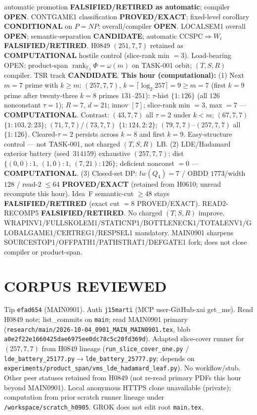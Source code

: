 \documentclass[11pt]{article}
\begin{document}
automatic promotion \textbf{FALSIFIED/RETIRED as automatic}; compiler \textbf{OPEN}.
CONTGAME1 classification \textbf{PROVED/EXACT}; fixed-level corollary \textbf{CONDITIONAL} on $P=NP$;
overall/compiler \textbf{OPEN}.
LOCALSEM1 overall \textbf{OPEN}; semantic-separation \textbf{CANDIDATE}; automatic CCSPC$\Rightarrow W_i$
\textbf{FALSIFIED/RETIRED}.
H0849 $(251,7,7)$ retained as \textbf{COMPUTATIONAL} hostile control (slice-rank min $=3$).
Load-bearing OPEN: product-span $\operatorname{rank}_{\mathbb F_2}\Phi=\omega(m)$ on TASK-001 orbit;
$(T,S,R)$ compiler. TSR track \textbf{CANDIDATE}.
\textbf{This hour (computational):}
(1) Next $m{=}7$ prime with $k{\ge}m$: $(257,7,7)$, $k=\lceil\log_2 257\rceil=9{\ge}m{=}7$
(first $k{=}9$ prime after twenty-three $k{=}8$ primes $131$--$251$):
$\tau$-hist $\{1{:}126\}$ (all $126$ nonconstant $\tau{=}1$); $R{=}7$, $d{=}21$; innov $[7]$;
slice-rank min $=3$, max $=7$ --- \textbf{COMPUTATIONAL}.
Contrast: $(43,7,7)$ all $\tau{=}2$ under $k{<}m$; $(67,7,7)$ $\{1{:}103,2{:}23\}$;
$(71,7,7)$/$(73,7,7)$ $\{1{:}124,2{:}2\}$; $(79,7,7)$--$(257,7,7)$ all $\{1{:}126\}$.
Cleared-$\tau{=}2$ persists across $k{=}8$ and first $k{=}9$. Easy-structure control --- not TASK-001,
not charged $(T,S,R)$ LB.
(2) LDE/Hadamard exterior battery (seed~$314159$) exhaustive $(257,7,7)$:
dist $\{(0,0){:}1,\,(1,0){:}1,\,(7,21){:}126\}$; deficient nonconst $=0$ --- \textbf{COMPUTATIONAL}.
(3) Closed-set DP: $lw(Q_4)=7$ / OBDD $1773$/width $128$ / read-$2$ $\le64$
\textbf{PROVED/EXACT} (retained from H0610; unread recompute this hour).
Idea~F semantic-cut $\ge48$ stays \textbf{FALSIFIED/RETIRED} (exact cut $=8$ PROVED/EXACT).
READ2-RECOMP5 \textbf{FALSIFIED/RETIRED}. No charged $(T,S,R)$ improve.
WRAPINV1/FULLSKOLEM1/STATICNP1/BOTTLENECK1/TOTALENV1/GLOBALGAME1/CERTREG1/RESPSEL1 mandatory.
MAIN0901 sharpens SOURCESTOP1/OFFPATH1/PATHSTRAT1/DEFGATE1 fork; does not close compiler or product-span.

\section*{CORPUS REVIEWED}
Tip \texttt{efad654} (MAIN0901). Auth \texttt{j15marti} (MCP user-GitHub-xai get\_me).
Read H0849 note; list\_commits on \texttt{main}; read MAIN0901 primary
(\texttt{research/main/2026-10-04\_0901\_MAIN\_MAIN0901.tex}, blob \texttt{a0e2f22e1660425dae6975ee0dc78c5c20fd369d}).
Adapted slice-cover runner for $(257,7,7)$ from H0849 lineage
(\texttt{run\_slice\_cover\_one.py} / \texttt{lde\_battery\_25177.py}$\to$\texttt{lde\_battery\_25777.py};
depends on \texttt{experiments/product\_span/vms\_lde\_hadamard\_leaf.py}).
No workflow/stub. Other peer statuses retained from H0849 (not re-read primary PDFs this hour beyond MAIN0901).
Local anonymous HTTPS clone unavailable (private);
computation from prior scratch runner lineage under \texttt{/workspace/scratch\_h0905}.
GROK does not edit root \texttt{main.tex}.
\end{document}
